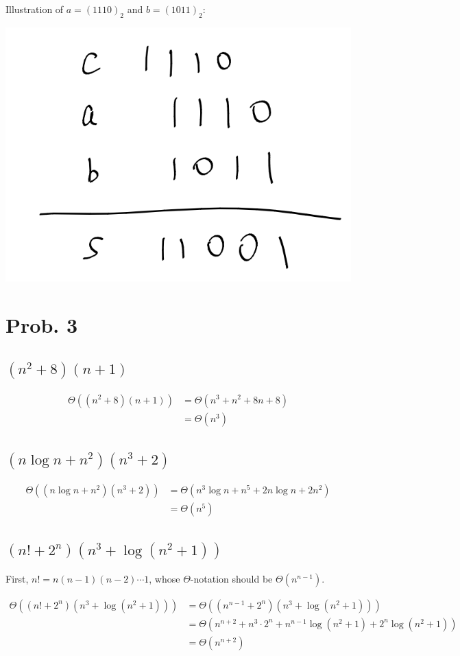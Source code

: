 \documentclass[12pt]{article}
\begin{document}
Illustration of $a = (1110)_2$ and $b = (1011)_2$:

\includegraphics[Illustration]{pics/as1prob2.1.png}

\section{Prob. 3}

\subsection{$(n^2+8)(n+1)$}
$$
\begin{aligned}
\Theta((n^2+8)(n+1)) &= \Theta(n^3 + n^2 + 8n + 8) \\
&= \Theta(n^3)
\end{aligned}
$$

\subsection{$(n\log n + n^2)(n^3+2)$}
$$
\begin{aligned}
\Theta((n\log n + n^2)(n^3+2)) &= \Theta(n^3 \log n + n^5 + 2n \log n + 2n^2) \\
&= \Theta(n^5)
\end{aligned}
$$

\subsection{$(n!+2^n)(n^3+\log{(n^2+1)})$}
First, $n! = n(n-1)(n-2)\cdots 1$, whose $\Theta$-notation should be $\Theta(n^{n-1})$.


$$
\begin{aligned}
\Theta((n!+2^n)(n^3+\log{(n^2+1)})) &= \Theta((n^{n-1}+2^n)(n^3+\log{(n^2+1)})) \\
&= \Theta(n^{n+2} + n^{3}\cdot 2^n + n^{n-1} \log{(n^2+1)} + 2^n \log{(n^2+1)}) \\
&= \Theta(n^{n+2})
\end{aligned}
$$
\end{document}
